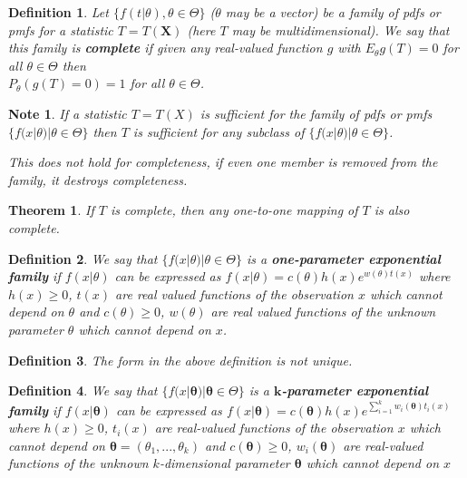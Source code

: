 \documentclass[14pt,twoside]{extreport}
\theoremstyle{dotless}
\newtheorem*{defn}{\footnotesize Definition}
\newtheorem*{thm}{\footnotesize Theorem} %
\newtheorem*{note}{\footnotesize Note} %
\begin{document}
\begin{defn}
    Let $\{ f(t|\theta), \theta \in \Theta \}$ ($\theta$ may be a vector) be a family of pdfs or pmfs for a statistic $T = T(\bm{X})$ (here $T$ may be multidimensional). We say that this family is \textbf{complete} if given any real-valued function $g$ with $E_\theta g(T) = 0$ for all $\theta \in \Theta$ then \\$P_\theta(g(T) = 0) = 1$ for all $\theta \in \Theta$.
\end{defn}

\begin{note}
    If a statistic $T = T(X)$ is sufficient for the family of pdfs or pmfs $\{ f(x|\theta) | \theta \in \Theta \}$ then $T$ is sufficient for any subclass of $\{ f(x|\theta) | \theta \in \Theta \}$. 

    This does not hold for completeness, if even one member is removed from the family, it destroys completeness.
\end{note}

\begin{thm}
    If $T$ is complete, then any one-to-one mapping of $T$ is also complete.
\end{thm}

\begin{defn}
    We say that $\{ f(x|\theta) | \theta \in \Theta \}$ is a \textbf{one-parameter exponential family} if $f(x|\theta)$ can be expressed as $f(x|\theta) = c(\theta) h(x) e^{w(\theta) t(x)}$ where $h(x) \geq 0$, $t(x)$ are real valued functions of the observation $x$ which cannot depend on $\theta$ and $c(\theta) \geq 0$, $w(\theta)$ are real valued functions of the unknown parameter $\theta$ which cannot depend on $x$. 
\end{defn}

\begin{defn}
    The form in the above definition is not unique.
\end{defn}

\begin{defn}
    We say that $\{ f(x|\bm{\theta}) | \bm{\theta} \in \Theta \}$ is a \textbf{$\bm{k}$-parameter exponential family} if $f(x|\bm{\theta})$ can be expressed as $f(x|\bm{\theta}) = c(\bm{\theta}) h(x) e^{\sum_{i=1}^k w_i(\bm{\theta}) t_i(x)}$ where $h(x) \geq 0$, $t_i (x)$ are real-valued functions of the observation $x$ which cannot depend on $\bm{\theta} = (\theta_1, ..., \theta_k)$ and $c(\bm{\theta}) \geq 0$, $w_i(\bm{\theta})$ are real-valued functions of the unknown $k$-dimensional parameter $\bm{\theta}$ which cannot depend on $x$
\end{defn}
\end{document}

